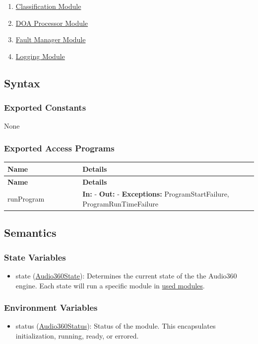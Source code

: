 \documentclass[12pt, titlepage]{article}
\newenvironment{apitable}{%
\begin{center}
\begin{longtable}{|p{0.3\linewidth}|p{0.7\linewidth}|} 
\hline
\textbf{Name} & \textbf{Details} \\
\hline
\endfirsthead
\hline
\textbf{Name} & \textbf{Details} \\
\hline
\endhead
\hline
\endfoot
\hline
\endlastfoot
}{%
\end{longtable}
\end{center}
}
\newcommand{\apifunc}[4]{%
#1 & 
\textbf{In:} #2 \newline
\textbf{Out:} #3 \newline
\textbf{Exceptions:} #4 \\
\hline
}
\begin{document}
\begin{enumerate}
  \item \hyperref[mod:Classification]{Classification Module}
  \item \hyperref[mod:DOA]{DOA Processor Module}
  \item \hyperref[mod:FaultManager]{Fault Manager Module} 
  \item \hyperref[mod:Logging]{Logging Module} 
\end{enumerate}

\subsection{Syntax}

\subsubsection{Exported Constants}

None

\subsubsection{Exported Access Programs}
\begin{apitable}
  \apifunc{runProgram}{-}{-}{ProgramStartFailure, ProgramRunTimeFailure}
\end{apitable}

\subsection{Semantics}

\subsubsection{State Variables}

\begin{itemize}
  \item state (\hyperref[enum:Audio360State]{Audio360State}): Determines the
    current state of the the Audio360 engine. Each state will run a specific
    module in \hyperref[mod:Audio360Engine_Uses]{used modules}.
\end{itemize}

\subsubsection{Environment Variables}

\begin{itemize}
  \item status (\hyperref[enum:Audio360Status]{Audio360Status}): Status of the
    module. This encapsulates initialization, running, ready, or errored.
\end{itemize}
\end{document}
